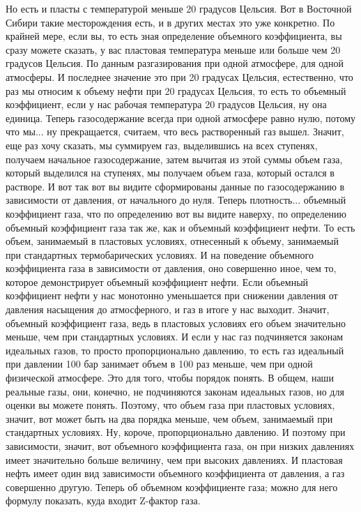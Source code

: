 \documentclass[main.tex]{subfiles}
\begin{document}
Но есть и пласты с температурой меньше 20 градусов Цельсия.
Вот в Восточной Сибири такие месторождения есть, и в других местах это уже конкретно.
По крайней мере, если вы, то есть зная определение объемного коэффициента, вы сразу можете сказать, у вас пластовая температура меньше или больше чем 20 градусов Цельсия.
По данным разгазирования при одной атмосфере, для одной атмосферы.
И последнее значение это при 20 градусах Цельсия, естественно, что раз мы относим к объему нефти при 20 градусах Цельсия, то есть то объемный коэффициент, если у нас рабочая температура 20 градусов Цельсия, ну она единица.
Теперь газосодержание всегда при одной атмосфере равно нулю, потому что мы... ну прекращается, считаем, что весь растворенный газ вышел.
Значит, еще раз хочу сказать, мы суммируем газ, выделившись на всех ступенях, получаем начальное газосодержание, затем вычитая из этой суммы объем газа, который выделился на ступенях, мы получаем объем газа, который остался в растворе.
И вот так вот вы видите сформированы данные по газосодержанию в зависимости от давления, от начального до нуля.
Теперь плотность... объемный коэффициент газа, что по определению вот вы видите наверху, по определению объемный коэффициент газа так же, как и объемный коэффициент нефти.
То есть объем, занимаемый в пластовых условиях, отнесенный к объему, занимаемый при стандартных термобарических условиях.
И на поведение объемного коэффициента газа в зависимости от давления, оно совершенно иное, чем то, которое демонстрирует объемный коэффициент нефти.
Если объемный коэффициент нефти у нас монотонно уменьшается при снижении давления от давления насыщения до атмосферного, и газ в итоге у нас выходит.
Значит, объемный коэффициент газа, ведь в пластовых условиях его объем значительно меньше, чем при стандартных условиях.
И если у нас газ подчиняется законам идеальных газов, то просто пропорционально давлению, то есть газ идеальный при давлении 100 бар занимает объем в 100 раз меньше, чем при одной физической атмосфере.
Это для того, чтобы порядок понять.
В общем, наши реальные газы, они, конечно, не подчиняются законам идеальных газов, но для оценки вы можете понять.
Поэтому, что объем газа при пластовых условиях, значит, вот может быть на два порядка меньше, чем объем, занимаемый при стандартных условиях.
Ну, короче, пропорционально давлению.
И поэтому при зависимости, значит, вот объемного коэффициента газа, он при низких давлениях имеет значительно больше величину, чем при высоких давлениях.
И пластовая нефть имеет один вид зависимости объемного коэффициента от давления, а газ совершенно другую.
Теперь об объемном коэффициенте газа; можно для него формулу показать, куда входит Z-фактор газа.
\end{document}

